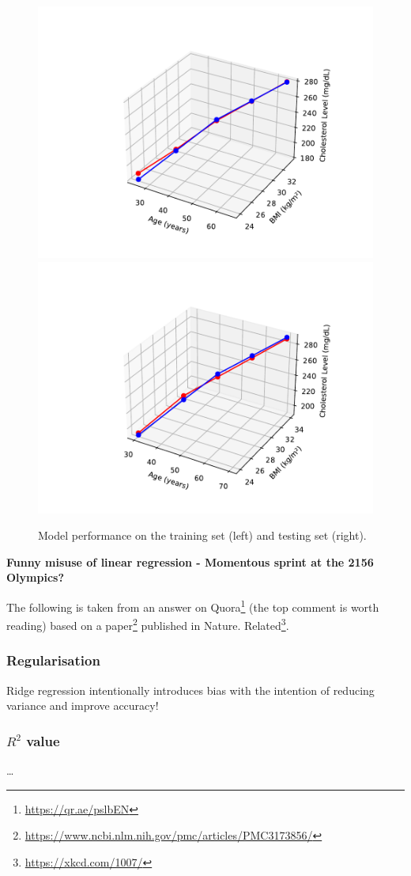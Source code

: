 \documentclass[11pt]{article}
\begin{document}
\begin{figure}[ht]
    \centering
    \includegraphics[width=0.49\columnwidth]{./figures/lin_reg_example/model_predicts_train.pdf}
    \includegraphics[width=0.49\columnwidth]{./figures/lin_reg_example/model_predicts_test.pdf}
    \caption{\centering Model performance on the training set (left) and testing set (right).}
    \label{fig:lin_reg_example_on_train_and_test}
\end{figure}

\begin{tcolorbox}[colback=c2]
    \textbf{Funny misuse of linear regression - Momentous sprint at the 2156 Olympics?}
    \vspace{10pt}

    The following is taken from an answer on Quora\footnote{\url{https://qr.ae/pslbEN}} (the top comment is worth reading) based on a paper\footnote{\url{https://www.ncbi.nlm.nih.gov/pmc/articles/PMC3173856/}} published in Nature. Related\footnote{\url{https://xkcd.com/1007/}}.
\end{tcolorbox}

\subsubsection{Regularisation}
Ridge regression intentionally introduces bias with the intention of reducing variance and improve accuracy!

\subsubsection{$R^2$ value}
\dots
\end{document}
